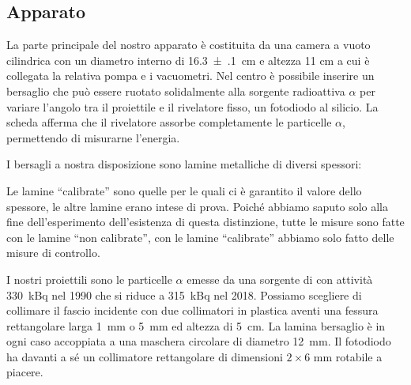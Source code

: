 \subsection{Apparato}

La parte principale del nostro apparato è costituita da una camera a vuoto cilindrica con un diametro interno di  \SI{16.3(1)}{cm} e altezza 11 cm a cui è collegata la relativa pompa e i vacuometri.
Nel centro è possibile inserire un bersaglio che può essere ruotato solidalmente alla sorgente radioattiva $\alpha$
per variare l'angolo tra il proiettile e il rivelatore fisso, un fotodiodo al silicio.
La scheda afferma che il rivelatore assorbe completamente le particelle $\alpha$,
permettendo di misurarne l'energia.

I bersagli a nostra disposizione sono lamine metalliche di diversi spessori:
Le lamine ``calibrate'' sono quelle per le quali ci è garantito il valore dello spessore,
le altre lamine erano intese di prova.
Poiché abbiamo saputo solo alla fine dell'esperimento dell'esistenza di questa distinzione,
tutte le misure sono fatte con le lamine ``non calibrate'',
con le lamine ``calibrate'' abbiamo solo fatto delle misure di controllo.

I nostri proiettili sono le particelle $\alpha$ emesse da una sorgente di \am{} con attività \SI{330}{kBq} nel 1990 che si riduce a \SI{315}{kBq} nel 2018.
Possiamo scegliere di collimare il fascio incidente con due collimatori in plastica aventi una fessura rettangolare larga \SI{1}{mm} o \SI{5}{mm} ed altezza di \SI{5}{cm}.
La lamina bersaglio è in ogni caso accoppiata a una maschera circolare di diametro \SI{12}{mm}.
Il fotodiodo ha davanti a sé un collimatore rettangolare di dimensioni $2\times 6$\! mm rotabile a piacere.
